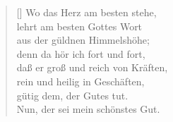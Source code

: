 \begin{multicols}{2}
\begin{verse}[\versewidth]
 Wo das Herz am besten stehe,\\
lehrt am besten Gottes Wort\\
aus der güldnen Himmelshöhe;\\
denn da hör ich fort und fort,\\
daß er groß und reich von Kräften,\\
rein und heilig in Geschäften,\\
gütig dem, der Gutes tut.\\
Nun, der sei mein schönstes Gut.
   
\end{verse}
\end{multicols}
